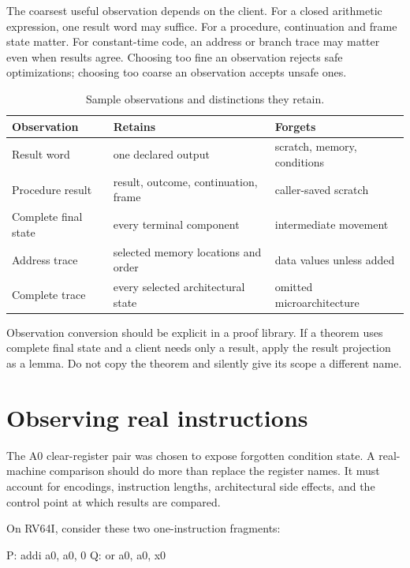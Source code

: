 The coarsest useful observation depends on the client. For a closed arithmetic
expression, one result word may suffice. For a procedure, continuation and
frame state matter. For constant-time code, an address or branch trace may
matter even when results agree. Choosing too fine an observation rejects safe
optimizations; choosing too coarse an observation accepts unsafe ones.

\begin{table}[htbp]
\centering
\caption{Sample observations and distinctions they retain.}
\begin{tabular}{@{}p{}p{}p{}@{}}
\toprule
Observation & Retains & Forgets \\
\midrule
Result word & one declared output & scratch, memory, conditions \\
Procedure result & result, outcome, continuation, frame & caller-saved scratch \\
Complete final state & every terminal component & intermediate movement \\
Address trace & selected memory locations and order & data values unless added \\
Complete trace & every selected architectural state & omitted microarchitecture \\
\bottomrule
\end{tabular}
\end{table}

Observation conversion should be explicit in a proof library. If a theorem
uses complete final state and a client needs only a result, apply the result
projection as a lemma. Do not copy the theorem and silently give its scope a
different name.

\section{Observing real instructions}

The A0 clear-register pair was chosen to expose forgotten condition state. A
real-machine comparison should do more than replace the register names. It
must account for encodings, instruction lengths, architectural side effects,
and the control point at which results are compared.

On RV64I, consider these two one-instruction fragments:

\begin{codelisting}[language={},caption={Two RV64I ways to copy a0 to itself}]
P: addi a0, a0, 0
Q: or   a0, a0, x0
\end{codelisting}

